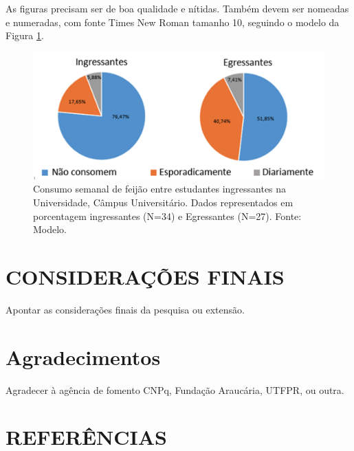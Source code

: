 \documentclass[%
  article,%
  a4paper,%
  12pt,%
  fleqn,%
  oneside,%
  chapter = TITLE,%
  section = TITLE,%
]{abntex2}
\begin{document}
As figuras precisam ser de boa qualidade e nítidas. Também devem ser nomeadas e numeradas, com fonte Times New Roman tamanho 10, seguindo o modelo da Figura \ref{fig:consumos}.

\captionsetup[figure]{width=0.75\textwidth}
\begin{figure}[h]
\centering%
\includegraphics[width = 0.75\columnwidth]{./Figuras/imagem_consumo}
\caption{Consumo semanal de feijão entre estudantes ingressantes na Universidade, Câmpus Universitário. Dados representados em porcentagem ingressantes (N=34) e Egressantes (N=27). Fonte: Modelo.}
\label{fig:consumos}
\end{figure}


\section{CONSIDERAÇÕES FINAIS}

\begin{flushleft}%
Apontar as considerações finais da pesquisa ou extensão.
\end{flushleft}


\postextual%

\section*{Agradecimentos}

Agradecer à agência de fomento CNPq, Fundação Araucária, UTFPR, ou outra.


\section*{REFERÊNCIAS}
\leading{13.8pt}
\printbibliography[heading=none]%

\end{document}
